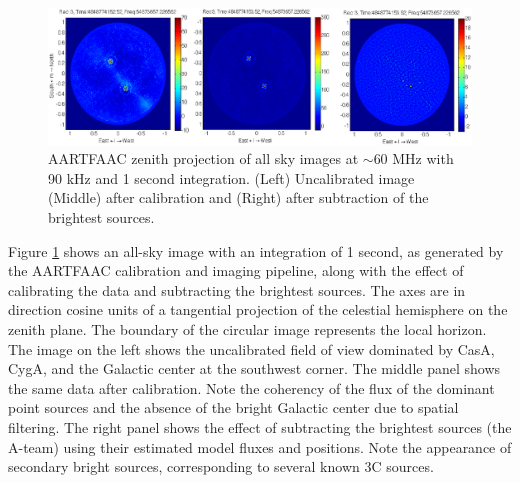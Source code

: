 \documentclass[referee]{aa}
\begin{document}
\begin{figure}[t]
\includegraphics[width=1\textwidth]{Figs/uncal_cal_deconv_night.eps}
\caption{AARTFAAC zenith projection of all sky images at $\sim$$60$  MHz with 90 kHz
  and  1   second  integration.   (Left)  Uncalibrated  image   (Middle)  after
  calibration and (Right) after subtraction of the brightest sources.}
\label{fig:uncal_cal_deconv_night}
\end{figure}

Figure   \ref{fig:uncal_cal_deconv_night}  shows  an   all-sky  image   with  an
integration of  1 second, as generated  by the AARTFAAC  calibration and imaging
pipeline,  along with the  effect of  calibrating the  data and  subtracting the
brightest  sources.  The  axes are  in direction  cosine units  of  a tangential
projection of the celestial hemisphere on the zenith plane.  The boundary of the
circular image  represents the local  horizon. The image  on the left  shows the
uncalibrated field of  view dominated by CasA, CygA, and  the Galactic center at
the southwest  corner. The middle panel shows the  same data after calibration.
Note the coherency of the flux of the dominant point sources and the absence of
the bright Galactic center due to  spatial filtering.  The right panel shows the
effect of subtracting  the brightest sources (the A-team)  using their estimated
model fluxes  and positions.  Note  the appearance of secondary  bright sources,
corresponding to several known 3C sources.

 
\end{document}
